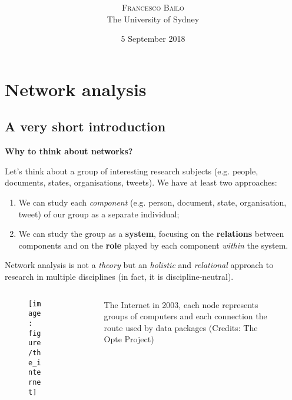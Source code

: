 \documentclass[serif, aspectratio=169]{beamer}
\title{\doctitle \\ \docsubtitle} %
\author{
\large
\textsc{Francesco Bailo}\\[2mm] 
\normalsize The University of Sydney \\
}
\date{5 September 2018}
\begin{document}
{
\begin{frame}
  \titlepage
\end{frame}
}
\addtocounter{framenumber}{-1}

\frame{\tableofcontents}

\section{Network analysis}

\subsection{A very short introduction}

\begin{frame}

\textbf{Why to think about networks?}

Let's think about a group of interesting research subjects (e.g. people, documents, states, organisations, tweets). We have at least two approaches:

\begin{enumerate}

\item We can study each \textit{component} (e.g. person, document, state, organisation, tweet) of our group as a separate individual;

\item We can study the group as a \textbf{system}, focusing on the \textbf{relations} between components and on the \textbf{role} played by each component \textit{within} the system.

\end{enumerate}

Network analysis is not a \textit{theory} but an \textit{holistic} and \textit{relational} approach to research in multiple disciplines (in fact, it is discipline-neutral).  

\end{frame}

\begin{frame}

\begin{columns}
\begin{column}{0.8\textwidth}
\begin{figure}
    \centering
    \texttt{[image: figure/the\_internet]}
\end{figure}
\end{column}
\begin{column}{0.2\textwidth}
\begin{figure}
\caption{The Internet in 2003, each node represents groups of computers and each connection the route used by data packages (Credits: The Opte Project)}
\end{figure}
\end{column}
\end{columns}

\end{frame}
\end{document}
